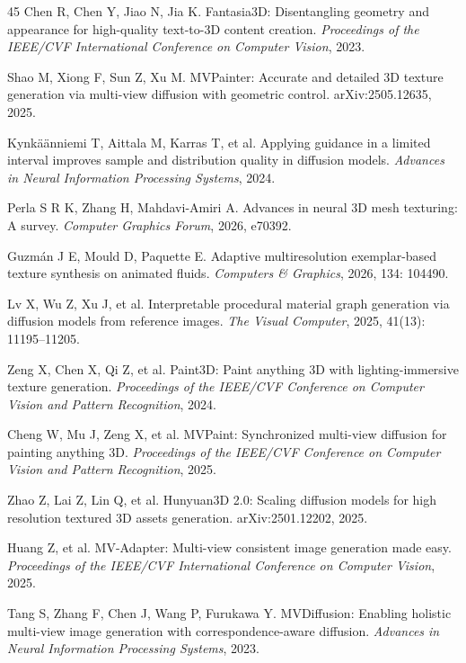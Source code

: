 \documentclass[times,twocolumn,final]{elsarticle}
\begin{document}
\begin{thebibliography}{45}
Chen R, Chen Y, Jiao N, Jia K. Fantasia3D: Disentangling geometry and appearance for high-quality text-to-3D content creation. \textit{Proceedings of the IEEE/CVF International Conference on Computer Vision}, 2023.

Shao M, Xiong F, Sun Z, Xu M. MVPainter: Accurate and detailed 3D texture generation via multi-view diffusion with geometric control. arXiv:2505.12635, 2025.

Kynk\"a\"anniemi T, Aittala M, Karras T, et al. Applying guidance in a limited interval improves sample and distribution quality in diffusion models. \textit{Advances in Neural Information Processing Systems}, 2024.

Perla S R K, Zhang H, Mahdavi-Amiri A. Advances in neural 3D mesh texturing: A survey. \textit{Computer Graphics Forum}, 2026, e70392.

Guzm\'an J E, Mould D, Paquette E. Adaptive multiresolution exemplar-based texture synthesis on animated fluids. \textit{Computers \& Graphics}, 2026, 134: 104490.

Lv X, Wu Z, Xu J, et al. Interpretable procedural material graph generation via diffusion models from reference images. \textit{The Visual Computer}, 2025, 41(13): 11195--11205.

Zeng X, Chen X, Qi Z, et al. Paint3D: Paint anything 3D with lighting-immersive texture generation. \textit{Proceedings of the IEEE/CVF Conference on Computer Vision and Pattern Recognition}, 2024.

Cheng W, Mu J, Zeng X, et al. MVPaint: Synchronized multi-view diffusion for painting anything 3D. \textit{Proceedings of the IEEE/CVF Conference on Computer Vision and Pattern Recognition}, 2025.

Zhao Z, Lai Z, Lin Q, et al. Hunyuan3D 2.0: Scaling diffusion models for high resolution textured 3D assets generation. arXiv:2501.12202, 2025.

Huang Z, et al. MV-Adapter: Multi-view consistent image generation made easy. \textit{Proceedings of the IEEE/CVF International Conference on Computer Vision}, 2025.

Tang S, Zhang F, Chen J, Wang P, Furukawa Y. MVDiffusion: Enabling holistic multi-view image generation with correspondence-aware diffusion. \textit{Advances in Neural Information Processing Systems}, 2023.


\end{thebibliography}
\end{document}
